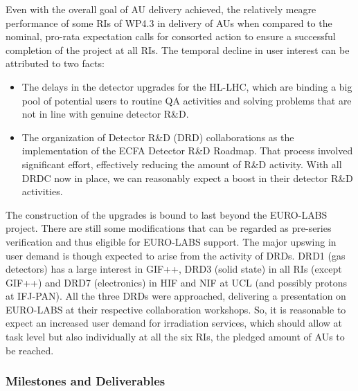 Even with the overall goal of AU delivery achieved, the relatively meagre performance of some RIs of WP4.3 in delivery of AUs when compared to the nominal, pro-rata expectation calls for consorted action to ensure a successful completion of the project at all RIs. The temporal decline in user interest can be attributed to two facts: 
\begin{itemize}
\item The delays in the detector upgrades for the HL-LHC, which are binding a big pool of potential users to routine QA activities and solving problems that are not in line with genuine detector R\&D.
\item The organization of Detector R\&D (DRD) collaborations as the implementation of the ECFA Detector R\&D Roadmap. That process involved significant effort, effectively reducing the amount of R\&D activity. With all DRDC now in place, we can reasonably expect a boost in their detector R\&D activities. 
\end{itemize}
The construction of the upgrades is bound to last beyond the EURO-LABS project. There are still some modifications that can be regarded as pre-series verification and thus eligible for EURO-LABS support. The major upswing in user demand is though expected to arise from the activity of DRDs. DRD1 (gas detectors) has a large interest in GIF++, DRD3 (solid state) in all RIs (except GIF++) and DRD7 (electronics) in HIF and NIF at UCL (and possibly protons at IFJ-PAN). All the three DRDs were approached, delivering a presentation on EURO-LABS at their respective collaboration workshops. So, it is reasonable to expect an increased user demand for irradiation services, which should allow at task level but also individually at all the six RIs, the pledged amount of AUs to be reached.

\subsubsection*{Milestones and Deliverables}

